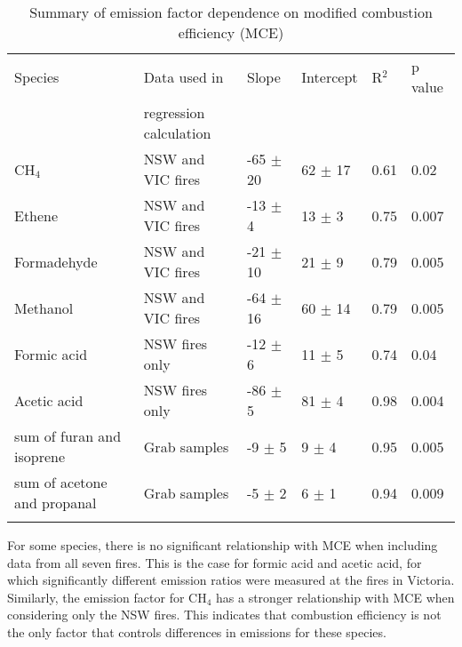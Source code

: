 \documentclass[acp, manuscript]{copernicus}
\begin{document}
\begin{table}
    \caption{Summary of emission factor dependence on modified combustion efficiency (MCE)}
  \begin{tabular}{l l l l l l } 
    \tophline
   Species & Data used in &  Slope & Intercept & R$^2$ & p value \\
   & regression calculation &&& &\\
   \hline
  CH$_4$& NSW and VIC fires & -65 $\pm$ 20 & 62 $\pm$ 17 & 0.61& 0.02 \\ 
  Ethene & NSW and VIC fires& -13 $\pm$ 4 & 13 $\pm$ 3 & 0.75 & 0.007 \\
  Formadehyde & NSW and VIC fires& -21 $\pm$ 10& 21 $\pm$ 9& 0.79 & 0.005\\
  Methanol  & NSW and VIC fires& -64 $\pm$ 16 & 60 $\pm$ 14 & 0.79 & 0.005\\
  Formic acid  & NSW fires only & -12 $\pm$ 6& 11 $\pm$ 5 & 0.74 & 0.04\\ 
  Acetic acid  & NSW fires only & -86 $\pm$ 5 & 81 $\pm$ 4 & 0.98 & 0.004 \\ 
  sum of furan and isoprene & Grab samples & -9 $\pm$ 5 & 9 $\pm$ 4 & 0.95 & 0.005 \\ 
  sum of acetone and propanal & Grab samples & -5 $\pm$ 2& 6 $\pm$ 1& 0.94 & 0.009 \\ 
    \bottomhline
  \end{tabular}
  \label{table:MCE_dep}
  \belowtable{} %
\end{table}

For some species, there is no significant relationship with MCE when including data from all seven fires. This is the case for formic acid and acetic acid, for which significantly different emission ratios were measured at the fires in Victoria. Similarly, the emission factor for CH$_4$ has a stronger relationship with MCE when considering only the NSW fires. This indicates that combustion efficiency is not the only factor that controls differences in emissions for these species. 
\end{document}
